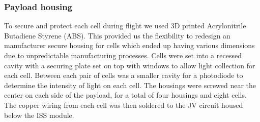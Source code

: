 \subsubsection{Payload housing}

To secure and protect each cell during flight we used 3D printed Acrylonitrile Butadiene Styrene (ABS). This provided us the flexibility to redesign an manufacturer secure housing for cells which ended up having various dimensions due to unpredictable manufacturing processes. Cells were set into a recessed cavity with a securing plate set on top with windows to allow light collection for each cell. Between each pair of cells was a smaller cavity for a photodiode to determine the intensity of light on each cell. The housings were screwed near the center on each side of the payload, for a total of four housings and eight cells. The copper wiring from each cell was then soldered to the JV circuit housed below the ISS module.
